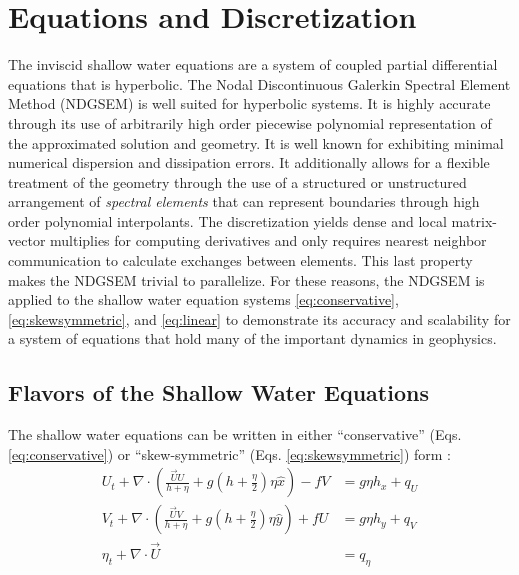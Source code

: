\documentclass{softwaremanual}
\begin{document}
\chapter{Equations and Discretization}
The inviscid shallow water equations are a system of coupled partial differential equations that is hyperbolic. The Nodal Discontinuous Galerkin Spectral Element Method (NDGSEM) is well suited for hyperbolic systems. It is highly accurate through its use of arbitrarily high order piecewise polynomial representation of the approximated solution and geometry. It is well known for exhibiting minimal numerical dispersion and dissipation errors. It additionally allows for a flexible treatment of the geometry through the use of a structured or unstructured arrangement of \textit{spectral elements} that can represent boundaries through high order polynomial interpolants. The discretization yields dense and local matrix-vector multiplies for computing derivatives and only requires nearest neighbor communication to calculate exchanges between elements. This last property makes the NDGSEM trivial to parallelize. For these reasons, the NDGSEM is applied to the shallow water equation systems \eqref{eq:conservative}, \eqref{eq:skewsymmetric}, and \eqref{eq:linear} to demonstrate its accuracy and scalability for a system of equations that hold many of the important dynamics in geophysics. 

\section{Flavors of the Shallow Water Equations}
The shallow water equations can be written in either ``conservative'' (Eqs. \ref{eq:conservative}) or ``skew-symmetric'' (Eqs. \ref{eq:skewsymmetric}) form :
\begin{subequations}
\begin{align}
U_t  + \nabla \cdot \left( \frac{\vec{U}U}{h + \eta} + g \left(h + \frac{\eta}{2} \right)\eta\hat{x} \right) - fV &= g\eta h_x  + q_U\\
V_t  + \nabla \cdot \left( \frac{\vec{U}V}{h + \eta} + g \left(h + \frac{\eta}{2} \right)\eta\hat{y} \right) + fU &= g\eta h_y + q_V\\
\eta_t + \nabla \cdot \vec{U} &= q_\eta
\end{align}\label{eq:conservative}
\end{subequations}
\end{document}
